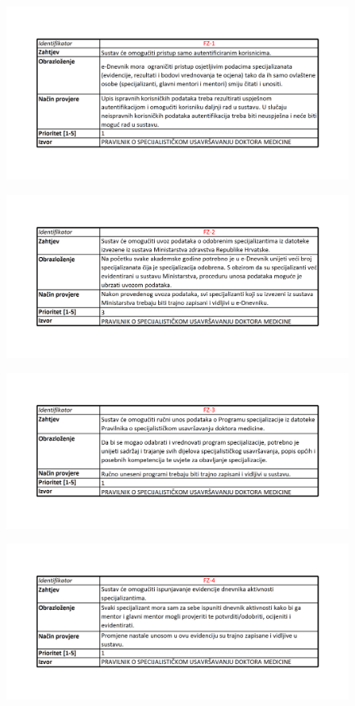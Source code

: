 \documentclass{scrreprt}
\begin{document}
\begin{figure}[h!]
    \centering
    \includegraphics[width=1\textwidth]{slike/1.png}
\end{figure}
\begin{figure}[h!]
    \centering
    \includegraphics[width=1\textwidth]{slike/2.png}
\end{figure}
\begin{figure}[h!]
    \centering
    \includegraphics[width=1\textwidth]{slike/3.png}
\end{figure}
\begin{figure}[h!]
    \centering
    \includegraphics[width=1\textwidth]{slike/4.png}
\end{figure}
\end{document}
